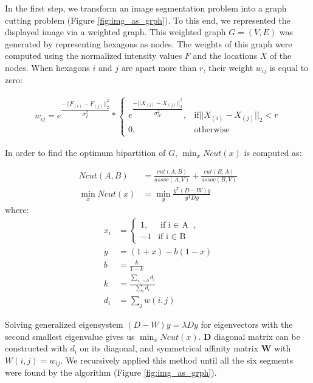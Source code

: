 \documentclass{article}
\begin{document}
In the first step, we transform an image segmentation problem into a graph cutting problem (Figure \ref{fig:img_as_grph}). To this end, we represented the displayed image via a weighted graph. This weighted graph $G = (V,E)$ was generated by representing hexagons as nodes. The weights of this graph were computed using the normalized intensity values $F$ and the locations $X$ of the nodes. When hexagons $i$ and $j$ are apart more than $r$, their weight $w_{ij}$ is equal to zero:


\begin{align}\label{eq:weight}
    w_{ij} = e^{\dfrac{-||F_{(i)} - F_{(j)}||_2^2}{\sigma_I^2}}
    *
        \begin{cases}
        e^\dfrac{-||X_{(i)} - X_{(j)}||_2^2}{\sigma_X^2}, &  \text{if} ||X_{(i)} - X_{(j)}||_2 < r\\
        0,                                               &  \text{otherwise}
        \end{cases}
\end{align}


In order to find the optimum bipartition of $G$, $\min_x Ncut(x)$ is computed as: \label{nCutVal}

\begin{align}
    Ncut(A,B) & = \frac{cut(A,B)}{assoc(A,V)} + \frac{cut(B,A)}{assoc(B,V)} \\
    \min_x Ncut(x) &= \min_y \frac{y^T (D-W) y}{y^T D y}
\end{align}
where:
\begin{align}
x_i &= 
\begin{cases} 
    1, & \text{if i $\in$ A }, \\
   -1  & \text{if i $\in$ B } 
\end{cases} \\ 
y &= (1+x) - b(1-x) \\
b &= \frac{k}{1-k} \\
k &= \frac{\sum_{x_i > 0} d_i}{\sum_{i} d_i} \\
d_i &= \sum_j w(i,j)
\end{align}

Solving generalized eigensystem $(D-W)y = \lambda Dy $ for eigenvectors with the second smallest eigenvalue gives us $\min_x Ncut(x)$. \textbf{D} diagonal matrix can be constructed with $d_i$ on its diagonal, and symmetrical affinity matrix \textbf{W} with $W(i,j) = w_{ij}$. We recursively applied this method until all the six segments were found by the algorithm (Figure \ref{fig:img_as_grph}).\label{cutNo}
\end{document}
